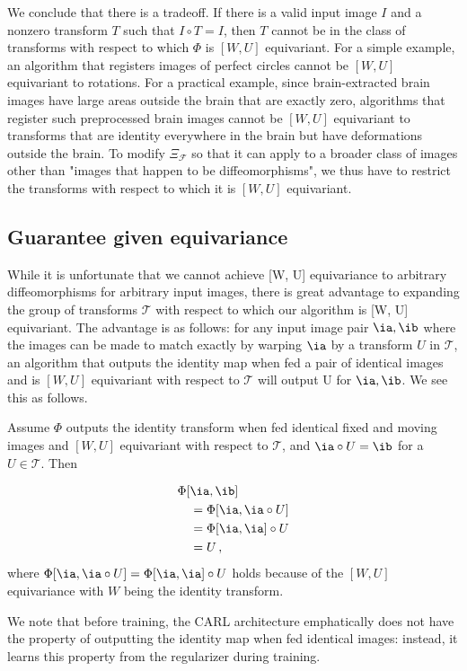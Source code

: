 We conclude that there is a tradeoff. If there is a valid input image $I$ and a nonzero transform $T$ such that $I \circ T = I$, then $T$ cannot be in the class of transforms with respect to which $\Phi$ is $[W, U]$ equivariant. For a simple example, an algorithm that registers images of perfect circles cannot be $[W, U]$ equivariant to rotations. For a practical example, since brain-extracted brain images have large areas outside the brain that are exactly zero, algorithms that register such preprocessed brain images cannot be $[W, U]$ equivariant to transforms that are identity everywhere in the brain but have deformations outside the brain. To modify $\Xi_\mathcal{F}$ so that it can apply to a broader class of images other than "images that happen to be diffeomorphisms", we thus have to restrict the transforms with respect to which it is $[W, U]$ equivariant. 

\subsection{Guarantee given equivariance}
\label{guarantee}
While it is unfortunate that we cannot achieve [W, U] equivariance to arbitrary diffeomorphisms for arbitrary input images, there is great advantage to expanding the group of transforms $\mathcal{T}$ with respect to which our algorithm is [W, U] equivariant. The advantage is as follows: for any input image pair $\ia, \ib$ where the images can be made to match exactly by warping $\ia$ by a transform $U$ in $\mathcal{T}$, an algorithm that outputs the identity map when fed a pair of identical images and is $[W, U]$ equivariant with respect to $\mathcal{T}$ will output U for $\ia, \ib$. We see this as follows.

Assume $\Phi$ outputs the identity transform when fed identical fixed and moving images and $[W, U]$ equivariant with respect to $\mathcal{T}$, and $\ia \circ U = \ib$ for a $U \in \mathcal{T}$. Then

\begin{align}
    \Phi[&\ia, \ib] \\
    &= \Phi[\ia, \ia \circ U] \\
    &= \Phi[\ia, \ia] \circ U \\
    &= U\,,
\end{align}
where $\Phi[\ia, \ia \circ U]=\Phi[\ia, \ia] \circ U$ holds because of the $[W,U]$ equivariance with $W$ being the identity transform. 

We note that before training, the CARL architecture emphatically does not have the property of outputting the identity map when fed identical images: instead, it learns this property from the regularizer during training.


